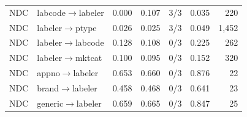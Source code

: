\begin{table}[t]
\begin{tabular}{llrrcrr}
NDC & labcode$\rightarrow$labeler & 0.000 & 0.107 & 3/3 & 0.035 & 220 \\
NDC & labeler$\rightarrow$ptype & 0.026 & 0.025 & 3/3 & 0.049 & 1,452 \\
NDC & labeler$\rightarrow$labcode & 0.128 & 0.108 & 0/3 & 0.225 & 262 \\
NDC & labeler$\rightarrow$mktcat & 0.100 & 0.095 & 0/3 & 0.152 & 320 \\
NDC & appno$\rightarrow$labeler & 0.653 & 0.660 & 0/3 & 0.876 & 22 \\
NDC & brand$\rightarrow$labeler & 0.458 & 0.468 & 0/3 & 0.641 & 23 \\
NDC & generic$\rightarrow$labeler & 0.659 & 0.665 & 0/3 & 0.847 & 25 \\
\bottomrule\end{tabular}\end{table}
